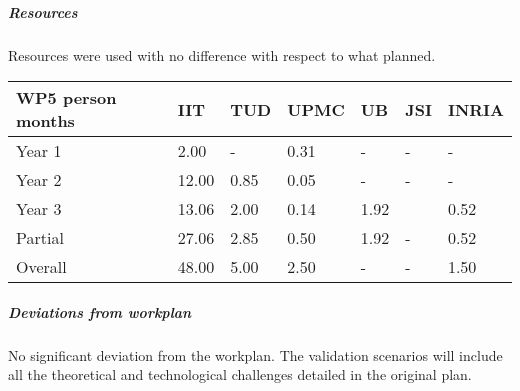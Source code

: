 
\subparagraph*{Resources}

Resources were used with no difference with respect to what planned. 

\begin{center}
\begin{tabular}{|C{1.5cm}|C{1.5cm}|C{1.5cm}|C{2cm}|C{2cm}|C{2cm}|C{2cm}|}
\hline
\footnotesize \textbf{WP5 person months}& \footnotesize \textbf{IIT}&\footnotesize \textbf{TUD}&\footnotesize \textbf{UPMC}& \footnotesize \textbf{UB} &\footnotesize \textbf{JSI} & \footnotesize \textbf{INRIA} \\ \hline
\footnotesize Year 1 &  2.00  & - & 0.31 & - & - & -     \\  \hline
\footnotesize Year 2 &  12.00  & 0.85 & 0.05 & - & - & -     \\  \hline
\footnotesize Year 3 &  13.06 & 2.00 & 0.14 & 1.92 &  & 0.52 \\ \hline
\footnotesize Partial &  27.06 & 2.85 & 0.50 & 1.92 & - & 0.52 \\
\hline \hline
\footnotesize Overall &  48.00 & 5.00 & 2.50 & - & - & 1.50 \\ \hline
\end{tabular}
\end{center}

\subparagraph*{Deviations from workplan} 
No significant deviation from the workplan. The validation scenarios will include all the theoretical and technological challenges detailed in the original plan.

